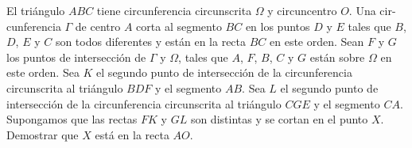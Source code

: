 El triángulo $ABC$ tiene circunferencia circunscrita $\Omega$ y circuncentro $O$. Una cir- cunferencia $\Gamma$ de centro $A$ corta al segmento $BC$ en los puntos $D$ y $E$ tales que $B$, $D$, $E$ y $C$ son todos diferentes y están en la recta $BC$ en este orden. Sean $F$ y $G$ los puntos de intersección de $\Gamma$ y $\Omega$, tales que $A$, $F$, $B$, $C$ y $G$ están sobre $\Omega$ en este orden. Sea $K$ el segundo punto de intersección de la circunferencia circunscrita al triángulo $BDF$ y el segmento $AB$. Sea $L$ el segundo punto de intersección de la circunferencia circunscrita al triángulo $CGE$ y el segmento $CA$. \newline 
Supongamos que las rectas $FK$ y $GL$ son distintas y se cortan en el punto $X$. Demostrar que $X$ está en la recta $AO$.